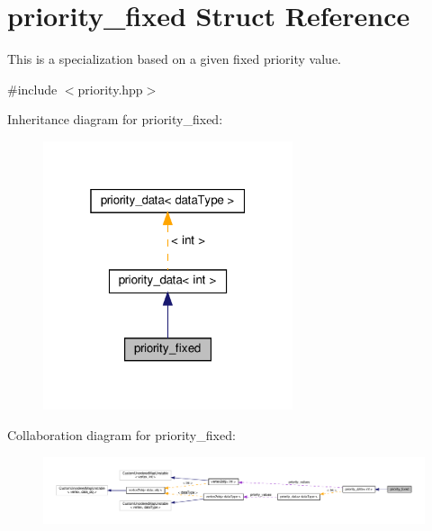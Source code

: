 \hypertarget{structpriority__fixed}{}\section{priority\+\_\+fixed Struct Reference}
\label{structpriority__fixed}


This is a specialization based on a given fixed priority value.  




{\ttfamily \#include $<$priority.\+hpp$>$}



Inheritance diagram for priority\+\_\+fixed\+:
\nopagebreak
\begin{figure}[H]
\begin{center}
\leavevmode
\includegraphics[width=208pt]{d3/d3b/structpriority__fixed__inherit__graph}
\end{center}
\end{figure}


Collaboration diagram for priority\+\_\+fixed\+:
\nopagebreak
\begin{figure}[H]
\begin{center}
\leavevmode
\includegraphics[width=350pt]{d8/d96/structpriority__fixed__coll__graph}
\end{center}
\end{figure}
